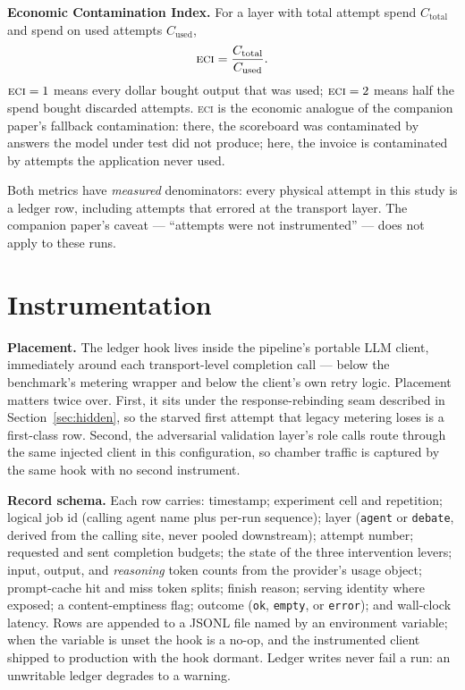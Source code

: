 \documentclass[11pt]{article}
\newcommand{\eci}{\textsc{eci}}
\begin{document}
\textbf{Economic Contamination Index.} For a layer with total attempt
spend $C_{\text{total}}$ and spend on used attempts $C_{\text{used}}$,
\[
\eci{} = \frac{C_{\text{total}}}{C_{\text{used}}}.
\]
$\eci{} = 1$ means every dollar bought output that was used; $\eci{} =
2$ means half the spend bought discarded attempts. \eci{} is the
economic analogue of the companion paper's fallback contamination: there,
the scoreboard was contaminated by answers the model under test did not
produce; here, the invoice is contaminated by attempts the application
never used.

Both metrics have \emph{measured} denominators: every physical attempt
in this study is a ledger row, including attempts that errored at the
transport layer. The companion paper's caveat --- ``attempts were not
instrumented'' --- does not apply to these runs.

\section{Instrumentation}\label{sec:instrumentation}

\textbf{Placement.} The ledger hook lives inside the pipeline's
portable LLM client, immediately around each transport-level completion
call --- below the benchmark's metering wrapper and below the client's
own retry logic. Placement matters twice over. First, it sits under the
response-rebinding seam described in Section~\ref{sec:hidden}, so the
starved first attempt that legacy metering loses is a first-class row.
Second, the adversarial validation layer's role calls route through the
same injected client in this configuration, so chamber traffic is
captured by the same hook with no second instrument.

\textbf{Record schema.} Each row carries: timestamp; experiment cell
and repetition; logical job id (calling agent name plus per-run
sequence); layer (\texttt{agent} or \texttt{debate}, derived from the
calling site, never pooled downstream); attempt number; requested and
sent completion budgets; the state of the three intervention levers;
input, output, and \emph{reasoning} token counts from the provider's
usage object; prompt-cache hit and miss token splits; finish reason;
serving identity where exposed; a content-emptiness flag; outcome
(\texttt{ok}, \texttt{empty}, or \texttt{error}); and wall-clock
latency. Rows are appended to a JSONL file named by an environment
variable; when the variable is unset the hook is a no-op, and the
instrumented client shipped to production with the hook dormant.
Ledger writes never fail a run: an unwritable ledger degrades to a
warning.
\end{document}
